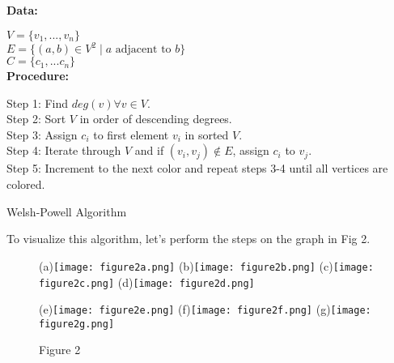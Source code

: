 \documentclass[12pt, letterpaper]{article}
\begin{document}
\begin{algorithm}[H]
\SetAlgoLined
\textbf{Data:} 


$V=\{v_1,...,v_n\}$\\
$E=\{(a,b)\in V^2 \mid a\text{ adjacent to } b\}$\\
$C=\{c_1,...c_n\}$\\
\textbf{Procedure:}


Step 1: Find $deg(v)\forall v\in V$.\\
Step 2: Sort $V$ in order of descending degrees.\\
Step 3: Assign $c_i$ to first element $v_i$ in sorted $V$.\\
Step 4: Iterate through $V$ and if $(v_i,v_j)\notin E$, assign $c_i$ to $v_j$.\\
Step 5: Increment to the next color and repeat steps 3-4 until all vertices are colored.
\caption{Welsh-Powell Algorithm}
\end{algorithm}


To visualize this algorithm, let's perform the steps on the graph in Fig 2.


\begin{figure}[h!]%
\begin{center}
	\subfloat(a){{\texttt{[image: figure2a.png]}}}%
	\qquad
	\subfloat(b){{\texttt{[image: figure2b.png]}}}%
	\subfloat(c){{\texttt{[image: figure2c.png]}}}%
	\qquad
	\subfloat(d){{\texttt{[image: figure2d.png]}}}%
\end{center}
\end{figure}
\begin{figure}[h!]\ContinuedFloat%
\begin{center}
	\subfloat(e){{\texttt{[image: figure2e.png]}}}%
	\qquad
	\subfloat(f){{\texttt{[image: figure2f.png]}}}%
	\subfloat(g){{\texttt{[image: figure2g.png]}}}%
	\caption*{Figure 2}
\end{center}
\end{figure}
\end{document}
